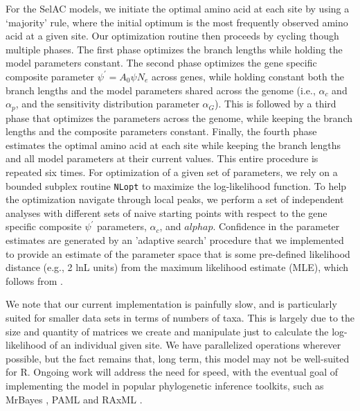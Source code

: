\documentclass{article}
\newcommand{\Ne}{\ensuremath{{N_e}}\xspace} %
\newcommand{\alphac}{\ensuremath{\alpha_c}\xspace}
\newcommand{\alphag}{\ensuremath{\alpha_G}\xspace}
\newcommand{\alphap}{\ensuremath{\alpha_p}\xspace}
\newcommand{\psiprime}{\ensuremath{\psi^\prime}\xspace}
\begin{document}
For the SelAC models, we initiate the optimal amino acid at each site by using a `majority' rule, where the initial optimum is the most frequently observed amino acid at a given site.
Our optimization routine then proceeds by cycling though multiple phases.
The first phase optimizes the branch lengths while holding the model parameters constant.
The second phase optimizes the gene specific composite parameter $ \psiprime = A_0 \psi \Ne$ across genes, while holding constant both the branch lengths and the model parameters shared across the genome (i.e., $\alphac$ and $\alphap$, and the sensitivity distribution parameter $\alphag$).
This is followed by a third phase that optimizes the parameters across the genome, while keeping the branch lengths and the composite parameters constant.
Finally, the fourth phase estimates the optimal amino acid at each site while keeping the branch lengths and all model parameters at their current values.
This entire procedure is repeated six times.
For optimization of a given set of parameters, we rely on a bounded subplex routine \texttt{NLopt} \citet{Johnson2012} to maximize the log-likelihood function.
To help the optimization navigate through local peaks, we perform a set of independent analyses with different sets of naive starting points with respect to the gene specific composite $\psiprime$ parameters, $\alphac$, and $alphap$.
Confidence in the parameter estimates are generated by an 'adaptive search' procedure that we implemented to provide an estimate of the parameter space that is some pre-defined likelihood distance (e.g., 2 lnL units) from the maximum likelihood estimate (MLE), which follows from \citet{BeaulieuAndOMeara2016}.

We note that our current implementation is painfully slow, and is particularly suited for smaller data sets in terms of numbers of taxa.
This is largely due to the size and quantity of matrices we create and manipulate just to calculate the log-likelihood of an individual given site.
We have parallelized operations wherever possible, but the fact remains that, long term, this model may not be well-suited for R.
Ongoing work will address the need for speed, with the eventual goal of implementing the model in popular phylogenetic inference toolkits, such as MrBayes \citep{HuelsenbeckEtAl2001,RonquistAndHuelsenbeck2003}, PAML \citep{Yang2007} and RAxML \citep{Stamatakis2006}.
\end{document}
